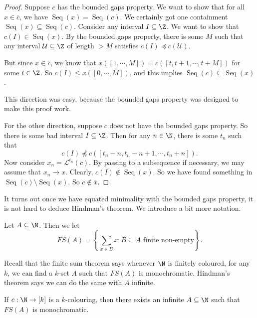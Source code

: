 \documentclass[a4paper]{article}
\DeclareMathOperator\Seq{Seq}
\begin{document}
\begin{proof}
  Suppose $c$ has the bounded gaps property. We want to show that for all $x \in \bar{c}$, we have $\Seq(x) = \Seq(c)$. We certainly got one containment $\Seq(x) \subseteq \Seq(c)$. Consider any interval $I \subseteq \Z$. We want to show that $c(I) \in \Seq(x)$. By the bounded gaps property, there is some $M$ such that any interval $\mathcal{U} \subseteq \Z$ of length $> M$ satisfies $c(I) \preccurlyeq c(\mathcal{U})$.

  But since $x \in \bar{c}$, we know that $x([1, \cdots, M]) = c([t, t+ 1, \cdots, t + M])$ for some $t \in \Z$. So $c(I) \leq x([0, \cdots, M])$, and this implies $\Seq(c) \subseteq \Seq (x)$.

  This direction was easy, because the bounded gaps property was designed to make this proof work.

  For the other direction, suppose $c$ does not have the bounded gaps property. So there is some bad interval $I \subseteq \Z$. Then for any $n \in \N$, there is some $t_n$ such that
  \[
    c(I) \not \preccurlyeq c([t_n - n, t_n - n + 1, \cdots, t_n + n]).
  \]
  Now consider $x_n = \mathcal{L}^{t_n}(c)$. By passing to a subsequence if necessary, we may assume that $x_n \to x$. Clearly, $c(I) \not\in \Seq(x)$. So we have found something in $\Seq(c) \setminus \Seq(x)$. So $c \not \in \bar{x}$.
\end{proof}
It turns out once we have equated minimality with the bounded gaps property, it is not hard to deduce Hindman's theorem. We introduce a bit more notation.
\begin{notation}
  Let $A \subseteq \N$. Then we let
  \[
    FS(A) = \left\{\sum_{x \in B} x: B \subseteq A\text{ finite non-empty}\right\}.
  \]
\end{notation}
Recall that the finite sum theorem says whenever $\N$ is finitely coloured, for any $k$, we can find a $k$-set $A$ such that $FS(A)$ is monochromatic. Hindman's theorem says we can do the same with $A$ infinite.

\begin{thm}
  If $c: \N \to [k]$ is a $k$-colouring, then there exists an infinite $A \subseteq \N$ such that $FS(A)$ is monochromatic.
\end{thm}
\end{document}
